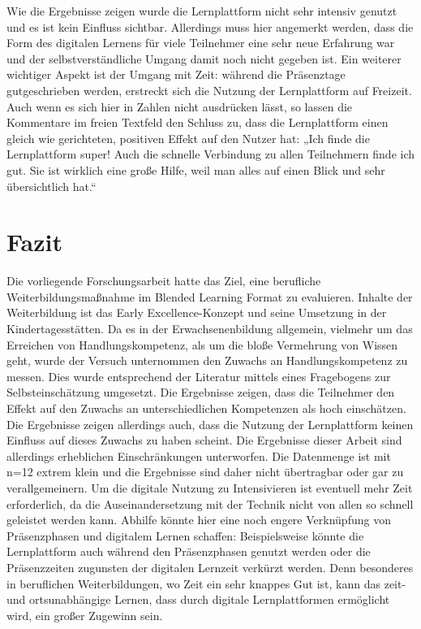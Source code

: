 \documentclass[12pt, bibliography=totoc]{scrartcl}
\begin{document}
Wie die Ergebnisse zeigen wurde die Lernplattform nicht sehr intensiv
genutzt und es ist kein Einfluss sichtbar. Allerdings muss hier
angemerkt werden, dass die Form des digitalen Lernens für viele
Teilnehmer eine sehr neue Erfahrung war und der selbstverständliche
Umgang damit noch nicht gegeben ist. Ein weiterer wichtiger Aspekt ist
der Umgang mit Zeit: während die Präsenztage gutgeschrieben werden,
erstreckt sich die Nutzung der Lernplattform auf Freizeit. Auch wenn es
sich hier in Zahlen nicht ausdrücken lässt, so lassen die Kommentare im
freien Textfeld den Schluss zu, dass die Lernplattform einen gleich wie
gerichteten, positiven Effekt auf den Nutzer hat: „Ich finde die
Lernplattform super! Auch die schnelle Verbindung zu allen Teilnehmern
finde ich gut. Sie ist wirklich eine große Hilfe, weil man alles auf
einen Blick und sehr übersichtlich hat.``

\section{Fazit}\label{fazit}

Die vorliegende Forschungsarbeit hatte das Ziel, eine berufliche
Weiterbildungsmaßnahme im Blended Learning Format zu evaluieren. Inhalte
der Weiterbildung ist das Early Excellence-Konzept und seine Umsetzung
in der Kindertagesstätten. Da es in der Erwachsenenbildung allgemein,
vielmehr um das Erreichen von Handlungskompetenz, als um die bloße
Vermehrung von Wissen geht, wurde der Versuch unternommen den Zuwachs an
Handlungskompetenz zu messen. Dies wurde entsprechend der Literatur
mittels eines Fragebogens zur Selbsteinschätzung umgesetzt. Die
Ergebnisse zeigen, dass die Teilnehmer den Effekt auf den Zuwachs an
unterschiedlichen Kompetenzen als hoch einschätzen. Die Ergebnisse
zeigen allerdings auch, dass die Nutzung der Lernplattform keinen
Einfluss auf dieses Zuwachs zu haben scheint. Die Ergebnisse dieser
Arbeit sind allerdings erheblichen Einschränkungen unterworfen. Die
Datenmenge ist mit n=12 extrem klein und die Ergebnisse sind daher nicht
übertragbar oder gar zu verallgemeinern. Um die digitale Nutzung zu
Intensivieren ist eventuell mehr Zeit erforderlich, da die
Auseinandersetzung mit der Technik nicht von allen so schnell geleistet
werden kann. Abhilfe könnte hier eine noch engere Verknüpfung von
Präsenzphasen und digitalem Lernen schaffen: Beispielsweise könnte die
Lernplattform auch während den Präsenzphasen genutzt werden oder die
Präsenzzeiten zugunsten der digitalen Lernzeit verkürzt werden. Denn
besonderes in beruflichen Weiterbildungen, wo Zeit ein sehr knappes Gut
ist, kann das zeit- und ortsunabhängige Lernen, dass durch digitale
Lernplattformen ermöglicht wird, ein großer Zugewinn sein.
\end{document}
